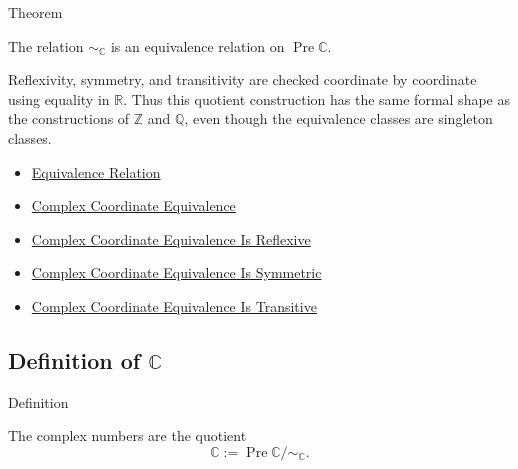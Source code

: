 \begin{theorembox}{Theorem}
\begin{theorem}
\label{thm:complex-coordinate-equivalence-relation}
The relation $\sim_{\mathbb{C}}$ is an equivalence relation on
\(\operatorname{Pre}\mathbb{C}\).
\end{theorem}
\end{theorembox}

\begin{remark*}
Reflexivity, symmetry, and transitivity are checked coordinate by coordinate
using equality in \(\mathbb{R}\). Thus this quotient construction has the same
formal shape as the constructions of \(\mathbb{Z}\) and \(\mathbb{Q}\), even
though the equivalence classes are singleton classes.
\end{remark*}

\begin{dependencies}
\begin{itemize}
  \item \hyperref[def:equivalence-relation]{Equivalence Relation}
  \item \hyperref[def:complex-coordinate-equivalence]{Complex Coordinate Equivalence}
  \item \hyperref[lem:complex-coordinate-equivalence-reflexive]{Complex Coordinate Equivalence Is Reflexive}
  \item \hyperref[lem:complex-coordinate-equivalence-symmetric]{Complex Coordinate Equivalence Is Symmetric}
  \item \hyperref[lem:complex-coordinate-equivalence-transitive]{Complex Coordinate Equivalence Is Transitive}
\end{itemize}
\end{dependencies}

\subsection*{\texorpdfstring{Definition of $\mathbb{C}$}{Definition of C}}

\begin{definitionbox}{Definition}
\begin{definition}
\label{def:complex-numbers}
The complex numbers are the quotient
\[
\mathbb{C}:=\operatorname{Pre}\mathbb{C}/{\sim_{\mathbb{C}}}.
\]
\end{definition}
\end{definitionbox}

